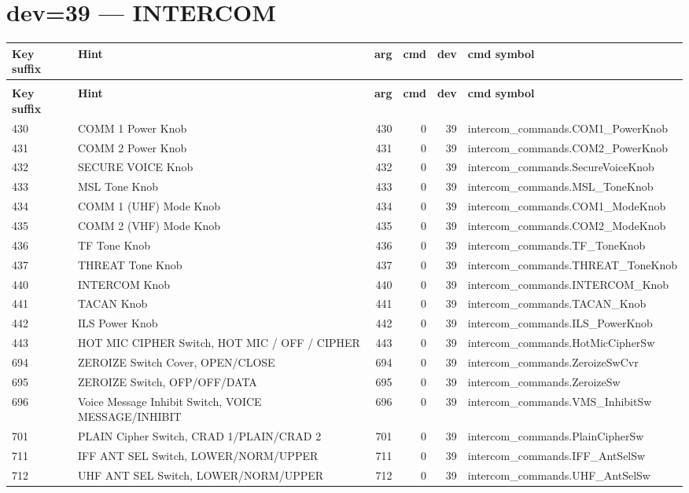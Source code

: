 \documentclass[10pt,a4paper]{article}
\begin{document}
\section{dev=39 — INTERCOM}
\begin{longtable}{>{\ttfamily\small}p{38mm} >{\small}p{72mm} r r r >{\ttfamily\small}p{48mm}}
\toprule
\textbf{Key suffix} & \textbf{Hint} & \textbf{arg} & \textbf{cmd} & \textbf{dev} & \textbf{cmd symbol} \\
\midrule
\endfirsthead
\multicolumn{6}{l}{\small\itshape continued\ldots}\\
\toprule
\textbf{Key suffix} & \textbf{Hint} & \textbf{arg} & \textbf{cmd} & \textbf{dev} & \textbf{cmd symbol} \\
\midrule
\endhead
\bottomrule
\endfoot
\rowcolor{rowodd}
  430 & COMM 1 Power Knob & 430 & 0 & 39 & intercom\_commands.COM1\_PowerKnob \\
  431 & COMM 2 Power Knob & 431 & 0 & 39 & intercom\_commands.COM2\_PowerKnob \\
\rowcolor{rowodd}
  432 & SECURE VOICE Knob & 432 & 0 & 39 & intercom\_commands.SecureVoiceKnob \\
  433 & MSL Tone Knob & 433 & 0 & 39 & intercom\_commands.MSL\_ToneKnob \\
\rowcolor{rowodd}
  434 & COMM 1 (UHF) Mode Knob & 434 & 0 & 39 & intercom\_commands.COM1\_ModeKnob \\
  435 & COMM 2 (VHF) Mode Knob & 435 & 0 & 39 & intercom\_commands.COM2\_ModeKnob \\
\rowcolor{rowodd}
  436 & TF Tone Knob & 436 & 0 & 39 & intercom\_commands.TF\_ToneKnob \\
  437 & THREAT Tone Knob & 437 & 0 & 39 & intercom\_commands.THREAT\_ToneKnob \\
\rowcolor{rowodd}
  440 & INTERCOM Knob & 440 & 0 & 39 & intercom\_commands.INTERCOM\_Knob \\
  441 & TACAN Knob & 441 & 0 & 39 & intercom\_commands.TACAN\_Knob \\
\rowcolor{rowodd}
  442 & ILS Power Knob & 442 & 0 & 39 & intercom\_commands.ILS\_PowerKnob \\
  443 & HOT MIC CIPHER Switch, HOT MIC / OFF / CIPHER & 443 & 0 & 39 & intercom\_commands.HotMicCipherSw \\
\rowcolor{rowodd}
  694 & ZEROIZE Switch Cover, OPEN/CLOSE & 694 & 0 & 39 & intercom\_commands.ZeroizeSwCvr \\
  695 & ZEROIZE Switch, OFP/OFF/DATA & 695 & 0 & 39 & intercom\_commands.ZeroizeSw \\
\rowcolor{rowodd}
  696 & Voice Message Inhibit Switch, VOICE MESSAGE/INHIBIT & 696 & 0 & 39 & intercom\_commands.VMS\_InhibitSw \\
  701 & PLAIN Cipher Switch, CRAD 1/PLAIN/CRAD 2 & 701 & 0 & 39 & intercom\_commands.PlainCipherSw \\
\rowcolor{rowodd}
  711 & IFF ANT SEL Switch, LOWER/NORM/UPPER & 711 & 0 & 39 & intercom\_commands.IFF\_AntSelSw \\
  712 & UHF ANT SEL Switch, LOWER/NORM/UPPER & 712 & 0 & 39 & intercom\_commands.UHF\_AntSelSw \\
\end{longtable}
\end{document}
